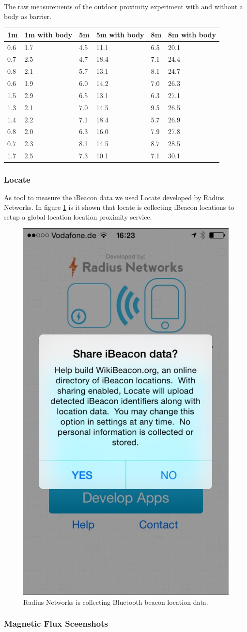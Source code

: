 The raw measurements of the outdoor proximity experiment with and without a body as barrier. \\


\begin{tabular}{|p{2.0cm}|p{2cm}|p{2.0cm}|p{2.0cm}|p{2cm}|p{2cm}|} \hline

1m&1m with body&5m&5m with body&8m&8m with body  \\ \hline
0.6&1.7&4.5&11.1&6.5&20.1 \\ \hline
0.7&2.5&4.7&18.4&7.1&24.4 \\ \hline
0.8&2.1&5.7&13.1&8.1&24.7 \\ \hline
0.6&1.9&6.0&14.2&7.0&26.3 \\ \hline
1.5&2.9&6.5&13.1&6.3&27.1 \\ \hline
1.3&2.1&7.0&14.5&9.5&26.5 \\ \hline
1.4&2.2&7.1&18.4&5.7&26.9 \\ \hline
0.8&2.0&6.3&16.0&7.9&27.8 \\ \hline
0.7&2.3&8.1&14.5&8.7&28.5 \\ \hline
1.7&2.5&7.3&10.1&7.1&30.1 \\ \hline

\end{tabular}

\subsubsection{Locate}

As tool to measure the iBeacon data we used Locate developed by Radius Networks. 
In figure \ref{fig:locate} is it shown that locate is collecting iBeacon locations to setup a global location location proximity service.

\begin{figure}[h]
	\centering
		\includegraphics[width=.4\textwidth]{images/experiments/locate.jpg}
	\caption{Radius Networks is collecting Bluetooth beacon location data.}
	\label{fig:locate}
\end{figure}

\subsubsection{Magnetic Flux Sceenshots}



